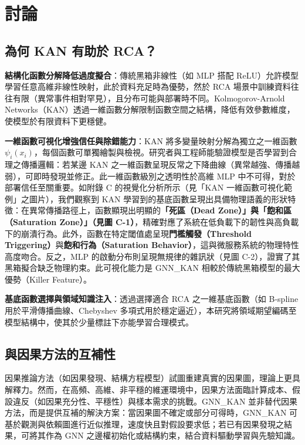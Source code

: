 \documentclass[10pt,a4paper,twocolumn]{article}
\begin{document}
\section{討論}

\subsection{為何 KAN 有助於 RCA？}

\textbf{結構化函數分解降低過度擬合}：傳統黑箱非線性（如 MLP 搭配 ReLU）允許模型學習任意高維非線性映射，此於資料充足時為優勢，然於 RCA 場景中訓練資料往往有限（異常事件相對罕見），且分布可能與部署時不同。Kolmogorov-Arnold Networks（KAN）透過一維函數分解限制函數空間之結構，降低有效參數維度，使模型於有限資料下更穩健。

\textbf{一維函數可視化增強信任與除錯能力}：KAN 將多變量映射分解為獨立之一維函數 $\psi_i(x_i)$，每個函數可單獨繪製與檢視。研究者與工程師能驗證模型是否學習到合理之傳播邏輯：若某邊 KAN 之一維函數呈現反常之下降曲線（異常越強、傳播越弱），可即時發現並修正。此一維函數級別之透明性於高維 MLP 中不可得，對於部署信任至關重要。如附錄 C 的視覺化分析所示（見「KAN 一維函數可視化範例」之圖片），我們觀察到 KAN 學習到的基底函數呈現出具備物理語義的形狀特徵：在異常傳播路徑上，函數顯現出明顯的\textbf{「死區（Dead Zone）」與「飽和區（Saturation Zone）」（見圖 C-1）}，精確對應了系統在低負載下的韌性與高負載下的崩潰行為。此外，函數在特定閾值處呈現\textbf{門檻觸發（Threshold Triggering）}與\textbf{飽和行為（Saturation Behavior）}，這與微服務系統的物理特性高度吻合。反之，MLP 的啟動分布則呈現無規律的雜訊狀（見圖 C-2），證實了其黑箱擬合缺乏物理約束。此可視化能力是 GNN\_KAN 相較於傳統黑箱模型的最大優勢（Killer Feature）。

\textbf{基底函數選擇與領域知識注入}：透過選擇適合 RCA 之一維基底函數（如 B-spline 用於平滑傳播曲線、Chebyshev 多項式用於穩定逼近），本研究將領域期望編碼至模型結構中，使其於少量標註下亦能學習合理模式。

\subsection{與因果方法的互補性}

因果推論方法（如因果發現、結構方程模型）試圖重建真實的因果圖，理論上更具解釋力。然而，在高頻、高維、非平穩的維運環境中，因果方法面臨計算成本、假設違反（如因果充分性、平穩性）與樣本需求的挑戰。GNN\_KAN 並非替代因果方法，而是提供互補的解決方案：當因果圖不確定或部分可得時，GNN\_KAN 可基於觀測與依賴圖進行近似推理，速度快且對假設要求低；若已有因果發現之結果，可將其作為 GNN 之邊權初始化或結構約束，結合資料驅動學習與先驗知識。
\end{document}
